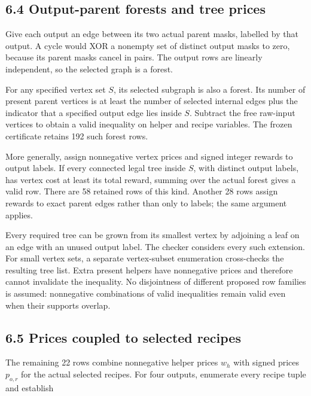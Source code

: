 \hypertarget{output-parent-forests-and-tree-prices}{%
\subsection{6.4 Output-parent forests and tree prices}\label{output-parent-forests-and-tree-prices}}

Give each output an edge between its two actual parent masks, labelled by that output. A cycle would XOR a nonempty set of distinct output masks to zero, because its parent masks cancel in pairs. The output rows are linearly independent, so the selected graph is a forest.

For any specified vertex set \(S\), its selected subgraph is also a forest. Its number of present parent vertices is at least the number of selected internal edges plus the indicator that a specified output edge lies inside \(S\). Subtract the free raw-input vertices to obtain a valid inequality on helper and recipe variables. The frozen certificate retains 192 such forest rows.

More generally, assign nonnegative vertex prices and signed integer rewards to output labels. If every connected legal tree inside \(S\), with distinct output labels, has vertex cost at least its total reward, summing over the actual forest gives a valid row. There are 58 retained rows of this kind. Another 28 rows assign rewards to exact parent edges rather than only to labels; the same argument applies.

Every required tree can be grown from its smallest vertex by adjoining a leaf on an edge with an unused output label. The checker considers every such extension. For small vertex sets, a separate vertex-subset enumeration cross-checks the resulting tree list. Extra present helpers have nonnegative prices and therefore cannot invalidate the inequality. No disjointness of different proposed row families is assumed: nonnegative combinations of valid inequalities remain valid even when their supports overlap.

\hypertarget{prices-coupled-to-selected-recipes}{%
\subsection{6.5 Prices coupled to selected recipes}\label{prices-coupled-to-selected-recipes}}

The remaining 22 rows combine nonnegative helper prices \(w_h\) with signed prices \(p_{o,r}\) for the actual selected recipes. For four outputs, enumerate every recipe tuple and establish

